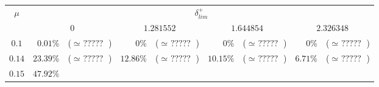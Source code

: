 \documentclass[10pt]{report}
\begin{document}
\begin{exercice}
\begin{center}
\begin{tabular}{|c|rl|rl|rl|rl|}\cline{1-9}
        \multirow{2}{*}{$\mu$}
         & 
    \multicolumn{8}{c|}{$\delta^+_{lim}$}
    
    
    
    
    
    
    
    \\ \cline{2-9}

    
        
         & 
    \multicolumn{2}{c|}{$0$}
     & 
    \multicolumn{2}{c|}{$1.281552$}
     & 
    \multicolumn{2}{c|}{$1.644854$}
     & 
    \multicolumn{2}{c|}{$2.326348$}
    
    \\ \cline{1-9}

    
        $0.1$
         & 
    
        $0.01\%$
         & 
    
        ($\simeq \mbox{ ????? }$)
         & 
    
        $0\%$
         & 
    
        ($\simeq \mbox{ ????? }$)
         & 
    
        $0\%$
         & 
    
        ($\simeq \mbox{ ????? }$)
         & 
    
        $0\%$
         & 
    
        ($\simeq \mbox{ ????? }$)
        
    \\ 

    
        $0.14$
         & 
    
        $23.39\%$
         & 
    
        ($\simeq \mbox{ ????? }$)
         & 
    
        $12.86\%$
         & 
    
        ($\simeq \mbox{ ????? }$)
         & 
    
        $10.15\%$
         & 
    
        ($\simeq \mbox{ ????? }$)
         & 
    
        $6.71\%$
         & 
    
        ($\simeq \mbox{ ????? }$)
        
    \\ 

    
        $0.15$
         & 
    
        $47.92\%$
         & 
    

\end{tabular}
\end{center}
\end{exercice}
\end{document}
